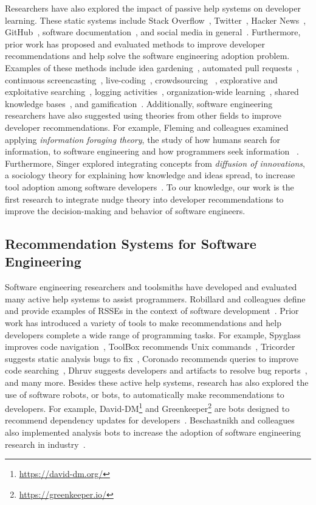 Researchers have also explored the impact of passive help systems on developer learning. These static systems include Stack Overflow~\cite{barua2014developers}, Twitter~\cite{singer2014twitter}, Hacker News~\cite{barik2015heart}, GitHub~\cite{dabbish2012social}, software documentation~\cite{Forward2002Documentation}, and social media in general~\cite{begel2010social}. Furthermore, prior work has proposed and evaluated methods to improve developer recommendations and help solve the software engineering adoption problem. Examples of these methods include idea gardening~\cite{CaoIdeaGarden}, automated pull requests~\cite{SamUgrade}, continuous screencasting~\cite{Murphy-HillScreencastingDiscovery}, live-coding~\cite{blackwell2014collaboration}, crowdsourcing ~\cite{gordon2015codepourri}, explorative and exploitative searching~\cite{karim2018learn}, logging activities~\cite{ToolBox}, organization-wide learning~\cite{OWL}, shared knowledge bases~\cite{Spyglass}, and gamification~\cite{barik2016game}. Additionally, software engineering researchers have also suggested using theories from other fields to improve developer recommendations. For example, Fleming and colleagues examined applying \textit{information foraging theory}, the study of how humans search for information, to software engineering and how programmers seek information ~\cite{fleming2013information}. Furthermore, Singer explored integrating concepts from \textit{diffusion of innovations}, a sociology theory for explaining how knowledge and ideas spread, to increase tool adoption among software developers~\cite{Diffusion}. To our knowledge, our work is the first research to integrate nudge theory into developer recommendations to improve the decision-making and behavior of software engineers.

\subsection{Recommendation Systems for Software Engineering} 

Software engineering researchers and toolsmiths have developed and evaluated many active help systems to assist programmers. Robillard and colleagues define and provide examples of RSSEs in the context of software development~\cite{RSSE}. Prior work has introduced a variety of tools to make recommendations and help developers complete a wide range of programming tasks. For example, Spyglass improves code navigation~\cite{Spyglass}, ToolBox recommends Unix commands~\cite{ToolBox}, Tricorder suggests static analysis bugs to fix~\cite{Tricorder}, Coronado recommends queries to improve code searching~\cite{Coronado}, Dhruv suggests developers and artifacts to resolve bug reports~\cite{Dhruv}, and many more. Besides these active help systems, research has also explored the use of software robots, or bots, to automatically make recommendations to developers. For example, David-DM\footnote{\url{https://david-dm.org/}} and Greenkeeper\footnote{\url{https://greenkeeper.io/}} are bots designed to recommend dependency updates for developers~\cite{sam2017autopullrequests}. Beschastnikh and colleagues also implemented analysis bots to increase the adoption of software engineering research in industry~\cite{beschastnikh2017accelerating}.

